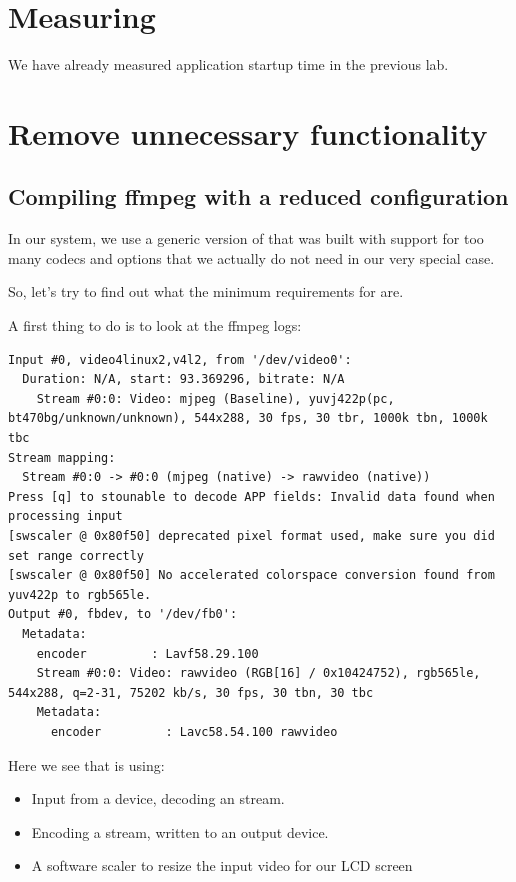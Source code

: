 
\section{Measuring}

We have already measured application startup time in the previous lab.

\section{Remove unnecessary functionality}

\subsection{Compiling ffmpeg with a reduced configuration}

In our system, we use a generic version of  that was built
with support for too many codecs and options that we actually do not
need in our very special case.

So, let's try to find out what the minimum requirements for
 are.

A first thing to do is to look at the {\code ffmpeg} logs:

{\scriptsize
\begin{verbatim}
Input #0, video4linux2,v4l2, from '/dev/video0':
  Duration: N/A, start: 93.369296, bitrate: N/A
    Stream #0:0: Video: mjpeg (Baseline), yuvj422p(pc, bt470bg/unknown/unknown), 544x288, 30 fps, 30 tbr, 1000k tbn, 1000k tbc
Stream mapping:
  Stream #0:0 -> #0:0 (mjpeg (native) -> rawvideo (native))
Press [q] to stounable to decode APP fields: Invalid data found when processing input
[swscaler @ 0x80f50] deprecated pixel format used, make sure you did set range correctly
[swscaler @ 0x80f50] No accelerated colorspace conversion found from yuv422p to rgb565le.
Output #0, fbdev, to '/dev/fb0':
  Metadata:
    encoder         : Lavf58.29.100
    Stream #0:0: Video: rawvideo (RGB[16] / 0x10424752), rgb565le, 544x288, q=2-31, 75202 kb/s, 30 fps, 30 tbn, 30 tbc
    Metadata:
      encoder         : Lavc58.54.100 rawvideo
\end{verbatim}
}

Here we see that  is using:
\begin{itemize}
\item Input from a  device, decoding an 
stream.
\item Encoding a  stream, written to an
 output device.
\item A software scaler to resize the input video for our LCD screen
\end{itemize}

